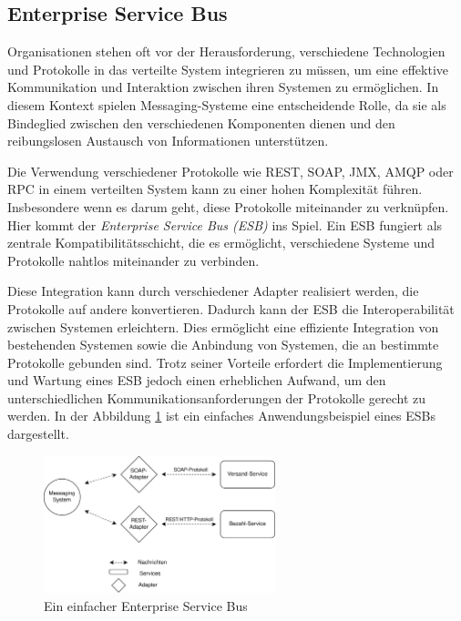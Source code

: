 \subsection{Enterprise Service Bus}

Organisationen stehen oft vor der Herausforderung, verschiedene Technologien und Protokolle in das verteilte System integrieren zu müssen, um eine effektive Kommunikation und Interaktion zwischen ihren Systemen zu ermöglichen. In diesem Kontext spielen Messaging-Systeme eine entscheidende Rolle, da sie als Bindeglied zwischen den verschiedenen Komponenten dienen und den reibungslosen Austausch von Informationen unterstützen. \cite{menge2007enterprise}

Die Verwendung verschiedener Protokolle wie REST, SOAP, JMX, AMQP oder RPC in einem verteilten System kann zu einer hohen Komplexität führen. Insbesondere wenn es darum geht, diese Protokolle miteinander zu verknüpfen. Hier kommt der \emph{Enterprise Service Bus (ESB)} ins Spiel. Ein ESB fungiert als zentrale Kompatibilitätsschicht, die es ermöglicht, verschiedene Systeme und Protokolle nahtlos miteinander zu verbinden. \cite{menge2007enterprise}

Diese Integration kann durch verschiedener Adapter realisiert werden, die Protokolle auf andere konvertieren. Dadurch kann der ESB die Interoperabilität zwischen Systemen erleichtern. Dies ermöglicht eine effiziente Integration von bestehenden Systemen sowie die Anbindung von Systemen, die an bestimmte Protokolle gebunden sind. Trotz seiner Vorteile erfordert die Implementierung und Wartung eines ESB jedoch einen erheblichen Aufwand, um den unterschiedlichen Kommunikationsanforderungen der Protokolle gerecht zu werden. In der Abbildung \ref{fig:enterpriseMessagingBus} ist ein einfaches Anwendungsbeispiel eines ESBs dargestellt. \cite{toshevLearningRabbitMQBuild2016,menge2007enterprise}

\begin{figure}
    \centering
    \includegraphics[width=0.6\textwidth]{content/img/Research/Message_Services/esb.png}
    \caption{Ein einfacher Enterprise Service Bus}
    \label{fig:enterpriseMessagingBus}
\end{figure}
\FloatBarrier

